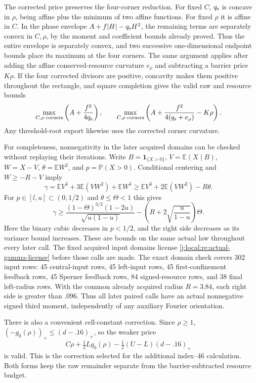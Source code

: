 The corrected price preserves the four-corner reduction. For fixed $C$,
$q_{\rm s}$ is concave in $\rho$, being affine plus the minimum of two
affine functions. For fixed $\rho$ it is affine in $C$. In the phase
envelope $A+f|H|-q_{\rm s}H^2$, the remaining terms are separately
convex in $C,\rho$, by the moment and coefficient bounds already proved.
Thus the entire envelope is separately convex, and two successive
one-dimensional endpoint bounds place its maximum at the four corners.
The same argument applies after adding the affine conserved-resource
curvature $e_\rho$ and subtracting a barrier price $K\rho$.
If the four corrected divisors are positive, concavity makes them
positive throughout the rectangle, and square completion gives the
valid raw and resource bounds
\[
 \max_{C,\rho\text{ corners}}\left(A+\frac{f^2}{4q_{\rm s}}\right),
 \qquad
 \max_{C,\rho\text{ corners}}
       \left(A+\frac{f^2}{4(q_{\rm s}+e_\rho)}-K\rho\right).
\]
Any threshold-root export likewise uses the corrected corner curvature.

For completeness, nonnegativity in the later acquired domains can be checked
without replaying their iterations. Write $B=\mathbf1_{\{X>0\}}$,
$V=\mathbb E(X\mid B)$,
$W=X-V$, $\theta=\mathbb E W^2$, and $p=\mathbb P(X>0)$. Conditional
centering and $W\ge-R-V$ imply
\[
 \gamma=\mathbb EV^3+3\mathbb E(VW^2)+\mathbb EW^3
 \ge\mathbb EV^3+2\mathbb E(VW^2)-R\theta.
\]
For $p\in[l,u]\subset(0,1/2)$ and $\theta\le\Theta<1$ this gives
\begin{equation}\label{j:local:re:actual-gamma-license}
 \gamma\ge
 \frac{(1-\Theta)^{3/2}(1-2u)}{\sqrt{u(1-u)}}
 -\left(R+2\sqrt{\frac{u}{1-u}}\right)\Theta.
\end{equation}
Here the binary cubic decreases in $p<1/2$, and the right side decreases
as its variance bound increases. These are bounds on the same actual law
throughout every later call. The fixed acquired input domains license
\eqref{j:local:re:actual-gamma-license} before those calls are made.
The exact domain check covers 302 input rows: 45 central-input rows,
45 left-input rows, 45 first-confinement feedback rows, 45 Sperner feedback
rows, 84 signed-resource rows, and 38 final left-radius rows. With the
common already acquired radius $R=3.84$, each right side is greater than
$.096$. Thus all later paired calls have an actual nonnegative signed
third moment, independently of any auxiliary Fourier orientation.

There is also a convenient cell-constant correction. Since $\rho\ge1$,
$(-g_0(\rho))_+\le(d-.16)_+$, so the weaker price
\[
 C\rho+\tfrac12L g_0(\rho)
       -\tfrac12(U-L)(d-.16)_+
\]
is valid. This is the correction selected for the additional index--46
calculation. Both forms keep the raw remainder separate from the
barrier-subtracted resource budget.

